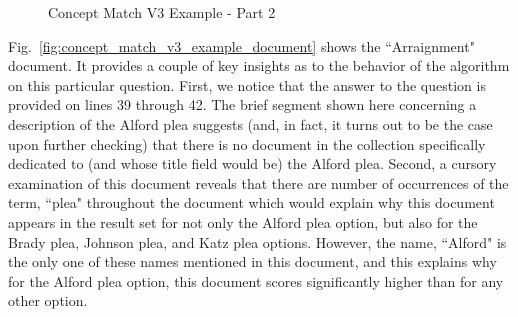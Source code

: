 \begin{figure}
\centering
\vspace{0.75in}
\caption{Concept Match V3 Example - Part 2}
\label{fig:concept_match_v3_example_part_2}
\end{figure}

Fig.~\ref{fig:concept_match_v3_example_document} shows the ``Arraignment" document.  It provides a couple of key insights as to the behavior of the algorithm on this particular question.  First, we notice that the answer to the question is provided on lines 39 through 42.  The brief segment shown here concerning a description of the Alford plea suggests (and, in fact, it turns out to be the case upon further checking) that there is no document in the collection specifically dedicated to (and whose title field would be) the Alford plea.  Second, a cursory examination of this document reveals that there are number of occurrences of the term, ``plea" throughout the document which would explain why this document appears in the result set for not only the Alford plea option, but also for the Brady plea, Johnson plea, and Katz plea options.  However, the name, ``Alford" is the only one of these names mentioned in this document, and this explains why for the Alford plea option, this document scores significantly higher than for any other option.

